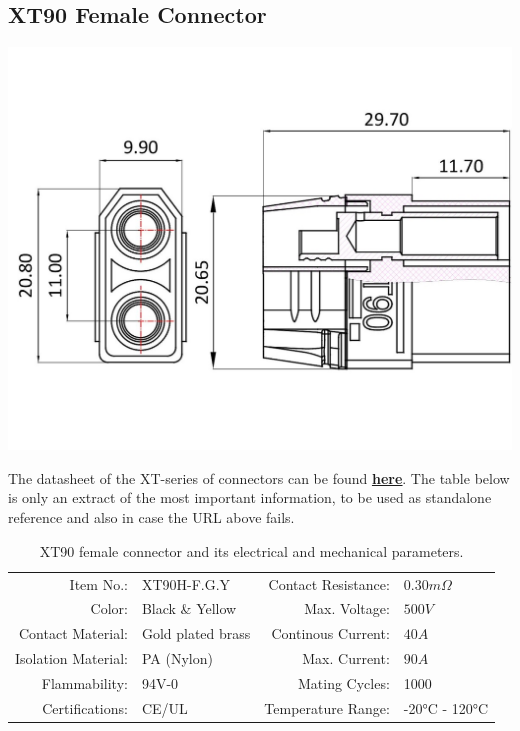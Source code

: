 \clearpage %

\subsection{XT90 Female Connector}

\includegraphics[width=\textwidth]{contents/figures/xt90_f.jpg}

The datasheet of the XT-series of connectors can be found \href{https://www.lcsc.com/datasheet/lcsc_datasheet_2207061800_Changzhou-Amass-Elec-XT90H-F-G-Y_C3040685.pdf}{\textbf{\underline{here}}}.
The table below is only an extract of the most important information, to be used as standalone reference and also in case the URL above fails.

\begin{table}[h] %
    \begin{tabular}{rlrl}
         Item No.:&  XT90H-F.G.Y &  Contact Resistance:& $0.30m \Omega$\\
         Color:&  Black \& Yellow&  Max. Voltage:& $500V$\\
         Contact Material:&  Gold plated brass&  Continous Current:& $40A$\\
         Isolation Material:&  PA (Nylon)&  Max. Current:& $90A$\\
         Flammability:&  94V-0&  Mating Cycles:& 1000\\
         Certifications:&  CE/UL&  Temperature Range:& -20°C - 120°C\\
    \end{tabular}
    \caption{XT90 female connector and its electrical and mechanical parameters.}
    \label{xt90_f_specs}
\end{table}

